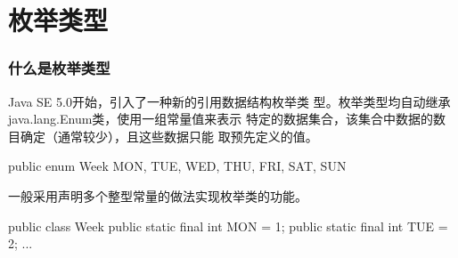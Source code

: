 \section{枚举类型}
\begin{frame}[fragile] %
\frametitle{什么是枚举类型}

Java SE 5.0开始，引入了一种新的引用数据结构{\hei\Red 枚举类
  型}。{\kai 枚举类型均自动继承java.lang.Enum类，使用一组常量值来表示
  特定的数据集合，该集合中数据的数目确定（通常较少），且这些数据只能
  取预先定义的值。}

\begin{javaCode}
  public enum Week {
    MON, TUE, WED, THU, FRI, SAT, SUN
  }
\end{javaCode}


一般采用声明多个整型常量的做法实现枚举类的功能。

\begin{javaCode}
  public class Week {
    public static final int MON = 1;
    public static final int TUE = 2;
    ...
  }    
\end{javaCode}
\end{frame}



